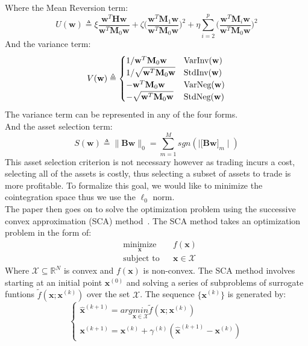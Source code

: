 \noindent Where the Mean Reversion term: $$U(\mathbf{w}) \triangleq \xi \frac{\mathbf{w}^T \mathbf{H}\mathbf{w}}{\mathbf{w}^T \mathbf{M}_0\mathbf{w}} + \zeta \biggl( \frac{\mathbf{w}^T \mathbf{M}_1\mathbf{w}}{\mathbf{w}^T \mathbf{M}_0\mathbf{w}} \biggr) ^2 + \eta \sum_{i=2}^{p} \biggl( \frac{\mathbf{w}^T \mathbf{M}_i\mathbf{w}}{\mathbf{w}^T \mathbf{M}_0\mathbf{w}}\biggr)^2$$ And the variance term: $$V(\mathbf{w}) \triangleq \begin{cases}
        1/\mathbf{w}^T \mathbf{M}_0\mathbf{w}        & \text{VarInv(\textbf{w})} \\
        1/\sqrt{\mathbf{w}^T \mathbf{M}_0\mathbf{w}} & \text{StdInv(\textbf{w})} \\
        -\mathbf{w}^T \mathbf{M}_0\mathbf{w}         & \text{VarNeg(\textbf{w})} \\
        -\sqrt{\mathbf{w}^T \mathbf{M}_0\mathbf{w}}  & \text{StdNeg(\textbf{w})}
    \end{cases}$$
The variance term can be represented in any of the four forms.
\\[3mm]
And the asset selection term: $$S(\mathbf{w}) \triangleq \big\| \mathbf{B} \mathbf{w}\big\|_0 = \sum_{m=1}^{M} sgn(\mid \bigl[ \mathbf{B} \mathbf{w} \bigr]_m \mid)$$ This asset selection criterion is not necessary however as trading incurs a cost, selecting all of the assets is costly, thus selecting a subset of assets to trade is more profitable. To formalize this goal, we would like to minimize the cointegration space thus we use the $\ell_0$ norm.
\\[3mm]
The paper then goes on to solve the optimization problem using the successive convex approximation (SCA) method~\cite{scaOptimization}. The SCA method takes an optimization problem in the form of:
\begin{equation*}
    \begin{aligned}
         & \underset{\mathbf{x}}{\text{minimize}}
         &                                        & f(\mathbf{x})              \\
         & \text{subject to}
         &                                        & \mathbf{x} \in \mathcal{X}
    \end{aligned}
\end{equation*}
\noindent Where $\mathcal{X} \subseteq \mathbb{R}^N$ is convex and $f(\mathbf{x})$ is non-convex. The SCA method involves starting at an initial point $\mathbf{x}^{(0)}$ and solving a series of subproblems of surrogate funtions $\tilde{f}(\mathbf{x}; \mathbf{x}^{(k)})$ over the set $\mathcal{X}$. The sequence $\bigl\{ \mathbf{x}^{(k)} \bigr\}$ is generated by: $$\begin{cases}
        \hat{\mathbf{x}}^{(k+1)} = arg \underset{\mathbf{x} \in \mathcal{X}}{min} \tilde{f}(\mathbf{x}; \mathbf{x}^{(k)}) \\
        \mathbf{x}^{(k+1)} = \mathbf{x}^{(k)} + \gamma^{(k)}(\hat{\mathbf{x}}^{(k+1)} - \mathbf{x}^{(k)})
    \end{cases}$$
